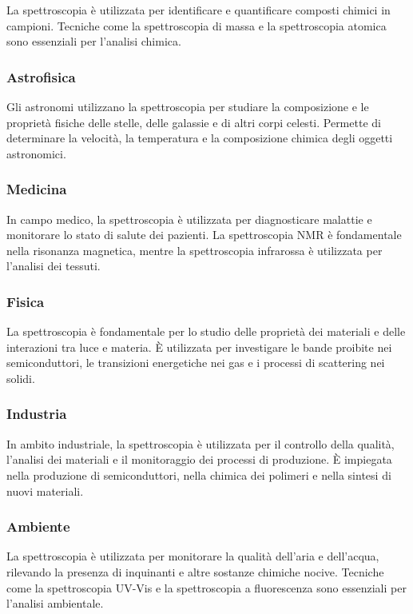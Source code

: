 \documentclass[12pt,a4paper]{report}
\begin{document}
La spettroscopia è utilizzata per identificare e quantificare composti chimici in campioni. Tecniche come la spettroscopia di massa e la spettroscopia atomica sono essenziali per l'analisi chimica.

\subsubsection{Astrofisica}

Gli astronomi utilizzano la spettroscopia per studiare la composizione e le proprietà fisiche delle stelle, delle galassie e di altri corpi celesti. Permette di determinare la velocità, la temperatura e la composizione chimica degli oggetti astronomici.

\subsubsection{Medicina}

In campo medico, la spettroscopia è utilizzata per diagnosticare malattie e monitorare lo stato di salute dei pazienti. La spettroscopia NMR è fondamentale nella risonanza magnetica, mentre la spettroscopia infrarossa è utilizzata per l'analisi dei tessuti.

\subsubsection{Fisica}

La spettroscopia è fondamentale per lo studio delle proprietà dei materiali e delle interazioni tra luce e materia. È utilizzata per investigare le bande proibite nei semiconduttori, le transizioni energetiche nei gas e i processi di scattering nei solidi.

\subsubsection{Industria}

In ambito industriale, la spettroscopia è utilizzata per il controllo della qualità, l'analisi dei materiali e il monitoraggio dei processi di produzione. È impiegata nella produzione di semiconduttori, nella chimica dei polimeri e nella sintesi di nuovi materiali.

\subsubsection{Ambiente}

La spettroscopia è utilizzata per monitorare la qualità dell'aria e dell'acqua, rilevando la presenza di inquinanti e altre sostanze chimiche nocive. Tecniche come la spettroscopia UV-Vis e la spettroscopia a fluorescenza sono essenziali per l'analisi ambientale.
\end{document}
